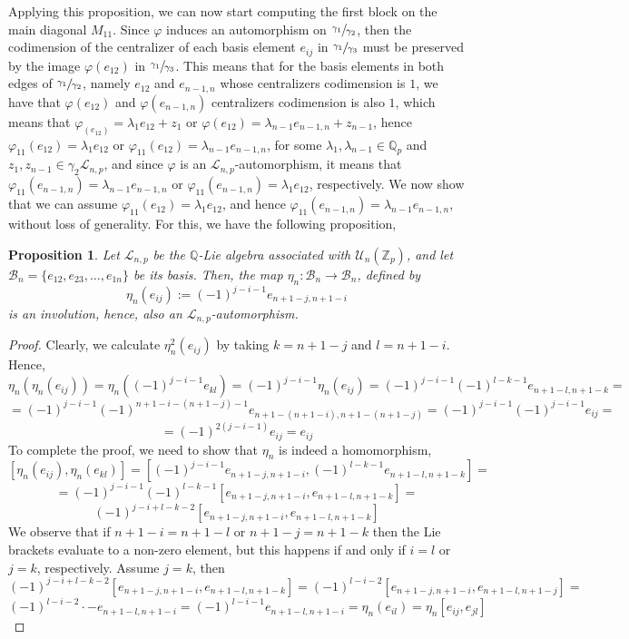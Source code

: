 \documentclass[12pt]{article}
\newtheorem{proposition}[theorem]{Proposition}
\begin{document}
Applying this proposition, we can now start computing the first block on the main diagonal $M_{11}$. Since $\varphi$ induces an automorphism on $\sfrac{\gamma_1}{\gamma_2}$, then the codimension of the centralizer of each basis element $e_{ij}$ in $\sfrac{\gamma_1}{\gamma_3}$ must be preserved by the image $\varphi(e_{12})$ in $\sfrac{\gamma_1}{\gamma_3}$. This means that for the basis elements in both edges of $\sfrac{\gamma_1}{\gamma_2}$, namely $e_{12}$ and $e_{n-1,n}$ whose centralizers codimension is $1$, we have that $\varphi(e_{12})$ and $\varphi(e_{n-1,n})$ centralizers codimension is also $1$, which means that $\varphi_(e_{12})=\lambda_1 e_{12}+z_1$ or $\varphi(e_{12})=\lambda_{n-1}e_{n-1,n}+z_{n-1}$, hence $\varphi_{11}(e_{12})=\lambda_1 e_{12}$ or $\varphi_{11}(e_{12})=\lambda_{n-1}e_{n-1,n}$, for some $\lambda_1,\lambda_{n-1}\in\mathbb{Q}_p$ and $z_1,z_{n-1}\in\gamma_2\mathcal{L}_{n,p}$, and since $\varphi$ is an $\mathcal{L}_{n,p}$-automorphism, it means that $\varphi_{11}(e_{n-1,n})=\lambda_{n-1}e_{n-1,n}$ or $\varphi_{11}(e_{n-1,n})=\lambda_1 e_{12}$, respectively. We now show that we can assume $\varphi_{11}(e_{12})=\lambda_1 e_{12}$, and hence $\varphi_{11}(e_{n-1,n})=\lambda_{n-1}e_{n-1,n}$, without loss of generality. For this, we have the following proposition,
\begin{proposition}
\label{prop.involution}
Let $\mathcal{L}_{n,p}$ be the $\mathbb{Q}$-Lie algebra associated with $\mathcal{U}_n(\mathbb{Z}_p)$, and let $\mathcal{B}_n=\{e_{12},e_{23},\dots,e_{1n}\}$ be its basis. Then, the map $\eta_n:\mathcal{B}_n\rightarrow \mathcal{B}_n$, defined by \[\eta_n(e_{ij}):=(-1)^{j-i-1}e_{n+1-j,n+1-i}\] is an involution, hence, also an $\mathcal{L}_{n,p}$-automorphism.
\end{proposition}
\begin{proof}
Clearly, we calculate $\eta_n^2(e_{ij})$ by taking $k=n+1-j$ and $l=n+1-i$. Hence, \[\eta_n(\eta_n(e_{ij}))=\eta_n((-1)^{j-i-1}e_{kl})=(-1)^{j-i-1}\eta_n(e_{ij})=(-1)^{j-i-1}(-1)^{l-k-1}e_{n+1-l,n+1-k}=\]\[=(-1)^{j-i-1}(-1)^{n+1-i-(n+1-j)-1}e_{n+1-(n+1-i),n+1-(n+1-j)}=(-1)^{j-i-1}(-1)^{j-i-1}e_{ij}=\]\[=(-1)^{2(j-i-1)}e_{ij}=e_{ij}\]
To complete the proof, we need to show that $\eta_n$ is indeed a homomorphism,
\[[\eta_n(e_{ij}),\eta_n(e_{kl})]=[(-1)^{j-i-1}e_{n+1-j,n+1-i},(-1)^{l-k-1}e_{n+1-l,n+1-k}]=\]\[=(-1)^{j-i-1}(-1)^{l-k-1}[e_{n+1-j,n+1-i},e_{n+1-l,n+1-k}]=\]\[(-1)^{j-i+l-k-2}[e_{n+1-j,n+1-i},e_{n+1-l,n+1-k}]\]
We observe that if $n+1-i=n+1-l$ or $n+1-j=n+1-k$ then the Lie brackets evaluate to a non-zero element, but this happens if and only if $i=l$ or $j=k$, respectively. Assume $j=k$, then \[(-1)^{j-i+l-k-2}[e_{n+1-j,n+1-i},e_{n+1-l,n+1-k}]=(-1)^{l-i-2}[e_{n+1-j,n+1-i},e_{n+1-l,n+1-j}]=\]\[(-1)^{l-i-2}\cdot-e_{n+1-l,n+1-i}=(-1)^{l-i-1}e_{n+1-l,n+1-i}=\eta_n(e_{il})=\eta_n[e_{ij},e_{jl}]\] 
\end{proof}
\end{document}
